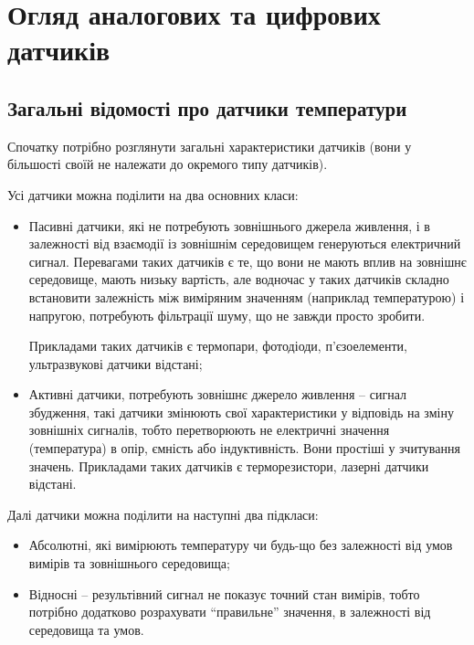 \chapter{Огляд аналогових та цифрових датчиків}

\section{Загальні відомості про датчики температури}


Спочатку потрібно розглянути загальні характеристики датчиків (вони у більшості своїй не належати до окремого типу датчиків).

Усі датчики можна поділити на два основних класи:

\begin{itemize}
    \item Пасивні датчики, які не потребують зовнішнього джерела живлення, і в залежності від взаємодії із зовнішнім середовищем генеруються електричний сигнал. Перевагами таких датчиків є те, що вони не мають вплив на зовнішнє середовище, мають низьку вартість, але водночас у таких датчиків складно встановити залежність між виміряним значенням (наприклад температурою) і напругою, потребують фільтрації шуму, що не завжди просто зробити.
    
    Прикладами таких датчиків є термопари, фотодіоди, п'єзоелементи, ультразвукові датчики відстані;
    \item Активні датчики, потребують зовнішнє джерело живлення -- сигнал збудження, такі датчики змінюють свої характеристики у відповідь на зміну зовнішніх сигналів, тобто перетворюють не електричні значення (температура) в опір, ємність або індуктивність. Вони простіші у зчитування значень. Прикладами таких датчиків є терморезистори, лазерні датчики відстані. 
\end{itemize}

Далі датчики можна поділити на наступні два підкласи:

\begin{itemize}
    \item Абсолютні, які вимірюють температуру чи будь-що без залежності від умов вимірів та зовнішнього середовища;
    \item Відносні -- результівний сигнал не показує точний стан вимірів, тобто потрібно додатково розрахувати ``правильне'' значення, в залежності від середовища та умов.
\end{itemize}

